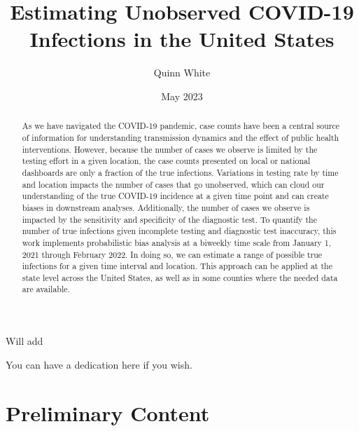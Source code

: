 \documentclass[12pt,twoside]{smiththesis}
\title{Estimating Unobserved COVID-19 Infections in the United States}
\author{Quinn White}
\date{May 2023}
\begin{document}
  \maketitle

\frontmatter %
\pagestyle{empty} %
  \begin{acknowledgements}
    Will add
  \end{acknowledgements}

  {
    \hypersetup{linkcolor=black}
    \setcounter{tocdepth}{2}
    \tableofcontents
  }


  \begin{abstract}
    As we have navigated the COVID-19 pandemic, case counts have been a central source of information for understanding transmission dynamics and the effect of public health interventions. However, because the number of cases we observe is limited by the testing effort in a given location, the case counts presented on local or national dashboards are only a fraction of the true infections. Variations in testing rate by time and location impacts the number of cases that go unobserved, which can cloud our understanding of the true COVID-19 incidence at a given time point and can create biases in downstream analyses. Additionally, the number of cases we observe is impacted by the sensitivity and specificity of the diagnostic test. To quantify the number of true infections given incomplete testing and diagnostic test inaccuracy, this work implements probabilistic bias analysis at a biweekly time scale from January 1, 2021 through February 2022. In doing so, we can estimate a range of possible true infections for a given time interval and location. This approach can be applied at the state level across the United States, as well as in some counties where the needed data are available.
  \end{abstract}
  \begin{dedication}
    You can have a dedication here if you wish.
  \end{dedication}
\mainmatter %
\pagestyle{fancyplain} %

\hypertarget{preliminary-content}{%
\chapter*{Preliminary Content}\label{preliminary-content}}
\end{document}
